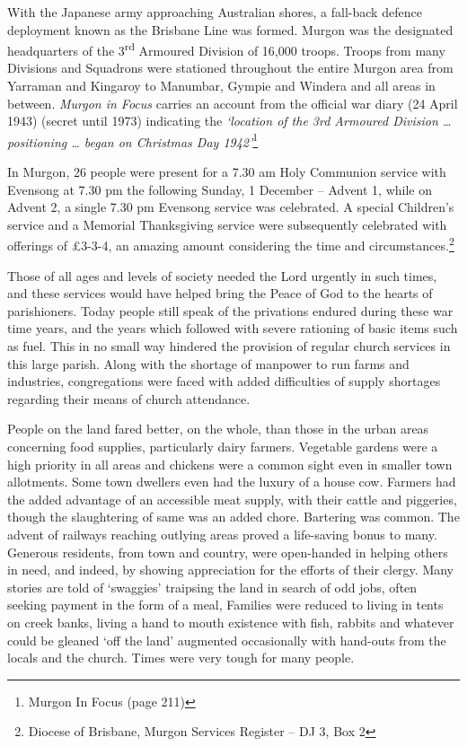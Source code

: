 With the Japanese army approaching Australian shores, a fall-back defence deployment known as the Brisbane Line was formed. Murgon was the designated headquarters of the 3\textsuperscript{rd} Armoured Division of 16,000 troops. Troops from many Divisions and Squadrons were stationed throughout the entire Murgon area from Yarraman and Kingaroy to Manumbar, Gympie and Windera and all areas in between. \emph{Murgon in Focus} carries an account from the official war diary (24 April 1943) (secret until 1973) indicating the \emph{`location of the 3rd Armoured Division \ldots{} positioning \ldots{} began on Christmas Day 1942'}\footnote{Murgon In Focus (page 211)}

In Murgon, 26 people were present for a 7.30 am Holy Communion service with Evensong at 7.30 pm the following Sunday, 1 December -- Advent 1, while on Advent 2, a single 7.30 pm Evensong service was celebrated. A special Children's service and a Memorial Thanksgiving service were subsequently celebrated with offerings of £3-3-4, an amazing amount considering the time and circumstances.\footnote{Diocese of Brisbane, Murgon Services Register -- DJ 3, Box 2}

Those of all ages and levels of society needed the Lord urgently in such times, and these services would have helped bring the Peace of God to the hearts of parishioners. Today people still speak of the privations endured during these war time years, and the years which followed with severe rationing of basic items such as fuel. This in no small way hindered the provision of regular church services in this large parish. Along with the shortage of manpower to run farms and industries, congregations were faced with added difficulties of supply shortages regarding their means of church attendance.

People on the land fared better, on the whole, than those in the urban areas concerning food supplies, particularly dairy farmers. Vegetable gardens were a high priority in all areas and chickens were a common sight even in smaller town allotments. Some town dwellers even had the luxury of a house cow. Farmers had the added advantage of an accessible meat supply, with their cattle and piggeries, though the slaughtering of same was an added chore. Bartering was common. The advent of railways reaching outlying areas proved a life-saving bonus to many. Generous residents, from town and country, were open-handed in helping others in need, and indeed, by showing appreciation for the efforts of their clergy. Many stories are told of `swaggies' traipsing the land in search of odd jobs, often seeking payment in the form of a meal, Families were reduced to living in tents on creek banks, living a hand to mouth existence with fish, rabbits and whatever could be gleaned `off the land' augmented occasionally with hand-outs from the locals and the church. Times were very tough for many people.

